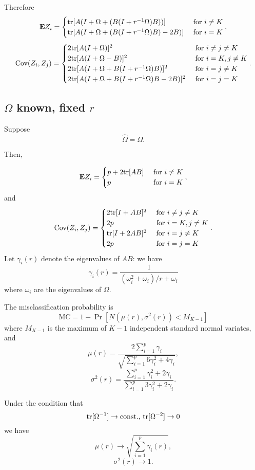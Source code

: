 \documentclass[12pt]{article}
\begin{document}
Therefore
\[
\textbf{E} Z_i = \begin{cases}
\text{tr}[A (I + \Omega + (B(I + r^{-1}\Omega) B))] & \text{ for }i \neq K\\
\text{tr}[A (I + \Omega + (B(I + r^{-1}\Omega) B) - 2B)] & \text{ for }i = K
\end{cases},
\]
\[
\text{Cov}(Z_i, Z_j) = 
\begin{cases}
2\text{tr}[A (I + \Omega)]^2 & \text{ for }i \neq j \neq K\\
2\text{tr}[A (I + \Omega - B)]^2 & \text{ for }i =K, j \neq K\\
2\text{tr}[A (I + \Omega + B(I + r^{-1}\Omega) B)]^2 & \text{ for }i=j \neq K\\
2\text{tr}[A (I + \Omega + B(I + r^{-1}\Omega) B - 2B)]^2 & \text{ for }i=j=K
\end{cases}.
\]

\subsection{$\Omega$ known, fixed $r$}

Suppose
\[
\hat{\Omega} = \Omega.
\]

Then,

\[
\textbf{E} Z_i = \begin{cases}
p + 2\text{tr}[AB] & \text{ for }i \neq K\\
p & \text{ for }i = K
\end{cases},
\]
and
\[
\text{Cov}(Z_i, Z_j) = 
\begin{cases}
2\text{tr}[I + AB]^2 & \text{ for }i \neq j \neq K\\
2p & \text{ for }i =K, j \neq K\\
\text{tr}[I + 2AB]^2 & \text{ for }i=j \neq K\\
2p & \text{ for }i=j=K
\end{cases}.
\]
Let $\gamma_i(r)$ denote the eigenvalues of $AB$: we have
\[
\gamma_i(r) = \frac{1}{(\omega_i^2 + \omega_i)/r + \omega_i}
\]
where $\omega_i$ are the eigenvalues of $\Omega$.

The misclassification probability is
\[
\text{MC} = 1 - \Pr[N(\mu(r), \sigma^2(r)) < M_{K-1}]
\]
where $M_{K-1}$ is the maximum of $K-1$ independent standard normal variates,
and
\[
\mu(r) = \frac{2\sum_{i=1}^p \gamma_i}{\sqrt{\sum_{i=1}^p 6\gamma_i^2 + 4 \gamma_i}},
\]
\[
\sigma^2(r) = \frac{\sum_{i=1}^p \gamma_i ^2 + 2\gamma_i}{\sum_{i=1}^p 3\gamma_i^2 + 2\gamma_i}.
\]

Under the condition that
\[
\text{tr}[\Omega^{-1}] \to \text{const., }\text{tr}[\Omega^{-2}] \to 0
\]
we have
\[
\mu(r) \to \sqrt{\sum_{i=1}^p \gamma_i(r)},
\]
\[
\sigma^2(r) \to 1.
\]
\end{document}
